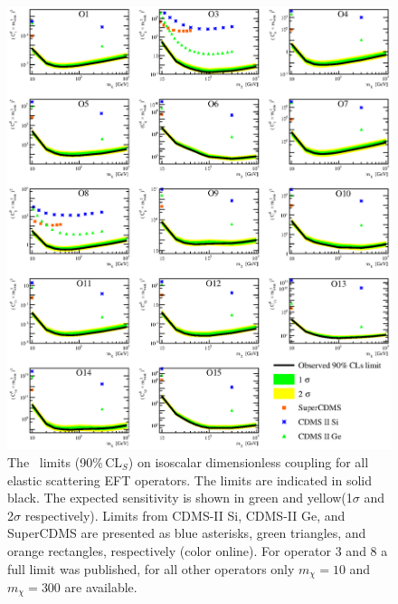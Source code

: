 \begin{figure}
\begin{minipage}{1.\linewidth}{}
\centerline{\includegraphics[width=\textwidth,height=0.99\textheight,keepaspectratio]{Figures/ElasticAllLimitCDMS.eps}}
\end{minipage}
\caption{The \Xehund\ limits (90\%\,CL$_S$) on isoscalar dimensionless coupling for all elastic scattering EFT operators. The limits are indicated in solid black. The expected sensitivity is shown in green and yellow(1$\sigma$ and 2$\sigma$ respectively). Limits from CDMS-II Si, CDMS-II Ge, and SuperCDMS \cite{CDMSEFT} are presented as blue asterisks, green triangles, and orange rectangles, respectively (color online). For operator 3 and 8 a full limit was published, for all other operators only $m_\chi = 10$ and $m_\chi =300$ are available.}
\label{fig:elasticLimit}
\end{figure}

